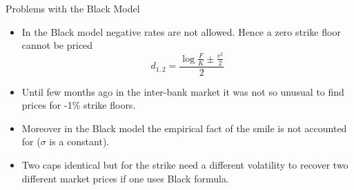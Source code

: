 \documentclass{beamer}
\begin{document}
%

\begin{frame}{Problems with the Black Model}
	\begin{itemize}
		\item In the Black model negative rates are not allowed. Hence a zero strike floor cannot be priced
		\begin{equation*}
		d_{1,2} = \frac{\boxed{\log{\frac{F}{K}}} \pm \frac{v^2}{2}}{2} 
		\end{equation*}
		\item Until few months ago in the inter-bank market it was not so unusual to find prices for -1\% strike floors.
		\item Moreover in the Black model the empirical fact of the smile is not accounted for ($\sigma$ is a constant).
		\item Two caps identical but for the strike need a different volatility to recover two different market prices if one uses Black formula.
	\end{itemize}
\end{frame}
\end{document}
